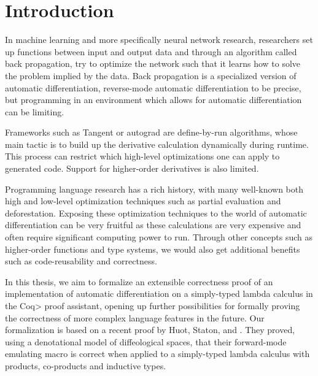\section{Introduction}
In machine learning and more specifically neural network research, researchers set up functions between input and output data and through an algorithm called back propagation, try to optimize the network such that it learns how to solve the problem implied by the data.
Back propagation is a specialized version of automatic differentiation, reverse-mode automatic differentiation to be precise, but programming in an environment which allows for automatic differentiation can be limiting.

Frameworks such as Tangent or autograd are define-by-run algorithms, whose main tactic is to build up the derivative calculation dynamically during runtime.
This process can restrict which high-level optimizations one can apply to generated code.
Support for higher-order derivatives is also limited.

Programming language research has a rich history, with many well-known both high and low-level optimization techniques such as partial evaluation and deforestation.
Exposing these optimization techniques to the world of automatic differentiation can be very fruitful as these calculations are very expensive and often require significant computing power to run.
Through other concepts such as higher-order functions and type systems, we would also get additional benefits such as code-reusability and correctness.

In this thesis, we aim to formalize an extensible correctness proof of an implementation of automatic differentiation on a simply-typed lambda calculus in the \<Coq> proof assistant, opening up further possibilities for formally proving the correctness of more complex language features in the future.
Our formalization is based on a recent proof by Huot, Staton, and \Vakar{} \cite{huot2020correctness}.
They proved, using a denotational model of diffeological spaces, that their forward-mode emulating macro is correct when applied to a simply-typed lambda calculus with products, co-products and inductive types.


